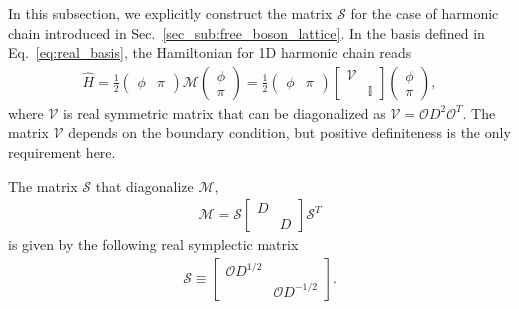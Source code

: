 In this subsection, we explicitly construct the matrix $\mathcal{S}$ for the case of harmonic chain introduced in Sec.~\ref{sec_sub:free_boson_lattice}. In the basis defined in Eq.~\eqref{eq:real_basis}, the Hamiltonian for 1D harmonic chain reads
\begin{equation}\begin{aligned}
\hat{H}
=\frac{1}{2}
\begin{pmatrix}
\phi & \pi
\end{pmatrix}
\mathcal{M}
\begin{pmatrix}
\phi\\
\pi
\end{pmatrix}
=\frac{1}{2}
\begin{pmatrix}
\phi & \pi
\end{pmatrix}
\begin{bmatrix}
\mathcal{V} \\
& {\mathbb{ I}}
\end{bmatrix}
\begin{pmatrix}
\phi\\
\pi
\end{pmatrix},
\end{aligned}\end{equation}
where $\mathcal{V}$ is real symmetric matrix that can be diagonalized as $\mathcal{V}=\mathcal{O}D^2\mathcal{O}^T$. The matrix $\mathcal{V}$ depends on the boundary condition, but positive definiteness is the only requirement here. 

The matrix $\mathcal{S}$ that diagonalize $\mathcal{M}$,
\begin{equation}
\begin{aligned}
\mathcal{M}=\mathcal{S}
\begin{bmatrix}
D \\ 
& D
\end{bmatrix}
\mathcal{S}^T
\end{aligned}
\end{equation}
is given by the following real symplectic matrix
\begin{equation}\begin{aligned}
\mathcal{S}\equiv
\begin{bmatrix}
\mathcal{O}D^{1/2} \\
& \mathcal{O}D^{-1/2}
\end{bmatrix}.
\end{aligned}\end{equation}


